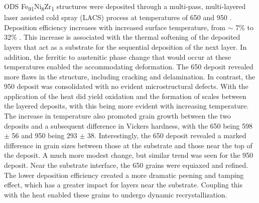 		 ODS Fe\textsubscript{91}Ni\textsubscript{8}Zr\textsubscript{1 }structures were deposited through a multi-pass, multi-layered laser assisted cold spray (LACS) process at temperatures of 650 \celsius{} and 950 \celsius{}. Deposition efficiency increases with increased surface temperature, from $ \sim $  7$\%$  to 32$\%$ . This increase is associated with the thermal softening of the deposited layers that act as a substrate for the sequential deposition of the next layer. In addition, the ferritic to austenitic phase change that would occur at these temperatures enabled the accommodating deformation. The 650 \celsius{} deposit revealed more flaws in the structure, including cracking and delamination. In contrast, the 950 \celsius{} deposit was consolidated with no evident microstructural defects. With the application of the heat did yield oxidation and the formation of scales between the layered deposits, with this being more evident with increasing temperature. The increase in temperature also promoted grain growth between the two deposits and a subsequent difference in Vickers hardness, with the 650 \celsius{} being 598 $ \pm $  56 and 950 \celsius{} being 293 $ \pm $  38. Interestingly, the 650 \celsius{} deposit revealed a marked difference in grain sizes between those at the substrate and those near the top of the deposit. A much more modest change, but similar trend was seen for the 950 \celsius{} deposit. Near the substrate interface, the 650 \celsius{} grains were equiaxed and refined. The lower deposition efficiency created a more dramatic peening and tamping effect, which has a greater impact for layers near the substrate. Coupling this with the heat enabled these grains to undergo dynamic recrystallization. 
